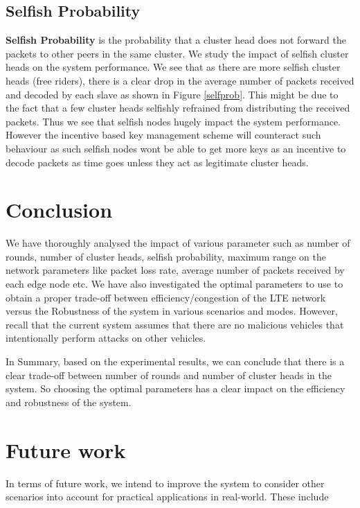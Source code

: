 \documentclass{acm_proc_article-sp}
\begin{document}
\subsection{Selfish Probability}
\vspace{1 mm}
\textbf{Selfish Probability} is the probability that a cluster head does not forward the packets to other peers in the same cluster. We study the impact of selfish cluster heads on the system performance. We see that as there are more selfish cluster heads (free riders), there is a clear drop in the average number of packets received and decoded by each slave as shown in Figure \ref{selfprob}. This might be due to the fact that a few cluster heads selfishly refrained from distributing the received packets. Thus we see that selfish nodes hugely impact the system performance. However the incentive based key management scheme will counteract such behaviour as such selfish nodes wont be able to get more keys as an incentive to decode packets as time goes unless they act as legitimate cluster heads. 
 
\section{Conclusion}
\vspace{1 mm}
We have thoroughly analysed the impact of various parameter such as number of rounds, number of cluster heads, selfish probability, maximum range on the network parameters like packet loss rate, average number of packets received by each edge node etc. We have also investigated the optimal parameters to use to obtain a proper trade-off between efficiency/congestion of the LTE network versus the Robustness of the system in various scenarios and modes. However, recall that the current system assumes that there are no malicious vehicles that intentionally perform attacks on other vehicles. 

In Summary, based on the experimental results, we can conclude that there is a clear trade-off between number of rounds and number of cluster heads in the system. So choosing the optimal parameters has a clear impact on the efficiency and robustness of the system.
\section{Future work}
\vspace{1 mm}
 
In terms of future work, we intend to improve the system to consider other scenarios into account for practical applications in real-world. These include
 
\end{document}
